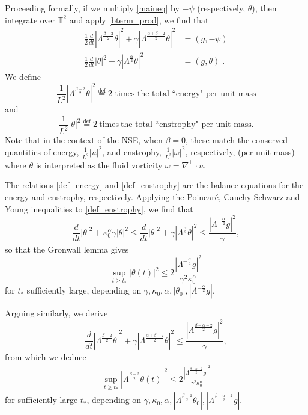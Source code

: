 \documentclass[twoside, reqno]{amsart}
\numberwithin{lemma}{section}
\numberwithin{theorem}{section}
\numberwithin{proposition}{section}
\numberwithin{equation}{section} %
\newcommand{\te}{\theta}
\newcommand{\ga}{\gamma}
\newcommand{\la}{\Lambda}
\newcommand{\TT}{\mathbb{T}}
\newcommand{\al}{\alpha}
\newcommand{\be}{\beta}
\newcommand{\gam}{\gamma}
\newcommand{\kap}{\kappa}
\newcommand{\Lam}{\Lambda}
\newcommand{\om}{\omega}
\begin{document}
{Proceeding formally, if} we multiply \eqref{maineq} by $-\psi$ (respectively, $\te$), then integrate over $\TT^2$ and apply \eqref{bterm_prod}, we find that
    \begin{align} 
        \frac{1}{2}\frac{d}{dt}|\la^{\frac{\beta-2}{2}}\te|^2 + \ga |\la^{\frac{\alpha+\beta-2}{2}}\te|^2 &= (g,-\psi)\label{def_energy}
        \\
        \frac{1}{2}\frac{d}{dt}|\te|^2 + \ga |\la^{\frac{\alpha}{2}}\te|^2 &= (g,\te)\;. \label{def_enstrophy}
    \end{align}
We define 
\begin{equation*}
    \frac{1}{L^2}|\la^{\frac{\beta-2}{2}}\te|^2 \overset{\text{def}}{=} \text{2 times the total ``energy" per unit mass}
\end{equation*}
and
\begin{equation*}
    \frac{1}{L^2}|\te|^2 \overset{\text{def}}{=} {2\ \text{times}\ } \text{the total ``enstrophy" per unit mass} .
\end{equation*}
Note that {in the context of the NSE}, when $\beta=0$, these match the {conserved quantities of energy, $\frac{1}{L^2}|u|^2$, and enstrophy, $\frac{1}{L^2}|\om|^2$, respectively, (per unit mass)} {where $\te$ is interpreted as the fluid vorticity $\om=\nabla^\perp\cdotp u$}.

The relations \eqref{def_energy} and \eqref{def_enstrophy} are the balance equations for the energy and enstrophy, respectively. Applying the Poincar\'e, Cauchy-Schwarz and Young inequalities to \eqref{def_enstrophy}, we find that
\begin{equation}\label{prod_G_a} 
  \frac{d}{dt} |\te|^2 + \kappa_0^{\alpha} \ga |\te|^2 \leq \frac{d}{dt} |\te|^2 + \ga |\la^{\frac{\alpha}{2}}\te|^2 \leq \frac{|\la^{-\frac{\alpha}{2}}g|^2}{\ga} ,    
\end{equation}
so that the Gronwall lemma gives
\begin{equation}\label{prod_G}
    {\sup_{t\geq t_*}|\te(t)|^2} \le 2\frac{|\la^{-\frac{\alpha}{2}}g|^2}{\ga^2\kappa_0^{\alpha}}
\end{equation}
for $t_*$ sufficiently large, {depending on $\gam,\kap_0,\al, |\theta_0|, |\Lam^{-\frac{\al}2}g|$.} 

 {Arguing similarly, we derive}
\begin{equation*}  
     \frac{d}{dt} |\la^{\frac{\beta-2}{2}}\te|^2 + \ga |\la^{\frac{\alpha+\beta-2}{2}}\te|^2 \leq \frac{|\la^{\frac{\beta-\alpha-2}{2}}g|^2}{\ga},
\end{equation*}
{from which we deduce
\begin{align}\label{prod_Gstar}
 \sup_{t\geq t_*}|\la^{\frac{\beta-2}{2}}\te(t)|^2 \le 2\frac{|\la^{\frac{\beta-\alpha-2}{2}}g|^2}{\ga^2\kappa_0^{\alpha}} 
\end{align}
for sufficiently large $t_*$, depending on $\gam,\kap_0,\al, |\Lam^{\frac{\be-2}2}\theta_0|, |\Lam^{\frac{\be-\al-2}2}g|$. }
\end{document}
